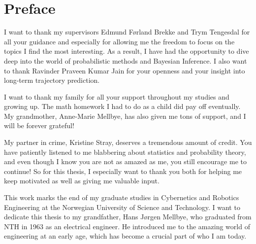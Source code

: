 \chapter*{Preface}

I want to thank my supervisors Edmund Førland Brekke and Trym Tengesdal for all your guidance and especially for allowing me the freedom to focus on the topics I find the most interesting. As a result, I have had the opportunity to dive deep into the world of probabilistic methods and Bayesian Inference. I also want to thank Ravinder Praveen Kumar Jain for your openness and your insight into long-term trajectory prediction.

I want to thank my family for all your support throughout my studies and growing up. The math homework I had to do as a child did pay off eventually. My grandmother, Anne-Marie Mellbye, has also given me tons of support, and I will be forever grateful!   

My partner in crime, Kristine Stray, deserves a tremendous amount of credit. You have patiently listened to me blabbering about statistics and probability theory, and even though I know you are not as amazed as me, you still encourage me to continue! So for this thesis, I especially want to thank you both for helping me keep motivated as well as giving me valuable input. 


This work marks the end of my graduate studies in Cybernetics and Robotics Engineering at the Norwegian University of Science and Technology. I want to dedicate this thesis to my grandfather, Hans Jørgen Mellbye, who graduated from NTH in 1963 as an electrical engineer. He introduced me to the amazing world of engineering at an early age, which has become a crucial part of who I am today. 

